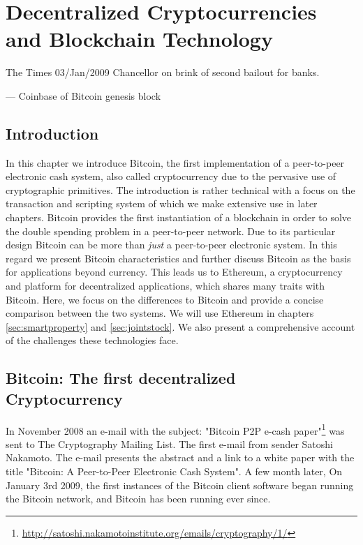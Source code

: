 \chapter{Decentralized Cryptocurrencies and Blockchain Technology}
\label{sec:crypto}

\epigraph{The Times 03/Jan/2009 Chancellor on brink of second bailout for banks.}{--- \textup{Coinbase of Bitcoin genesis block}}

\section{Introduction}
In this chapter we introduce Bitcoin, the first implementation of a peer-to-peer electronic cash system, also called cryptocurrency due to the pervasive use of cryptographic primitives. The introduction is rather technical with a focus on the transaction and scripting system of which we make extensive use in later chapters. Bitcoin provides the first instantiation of a blockchain in order to solve the double spending problem in a peer-to-peer network. Due to its particular design Bitcoin can be more than \emph{just} a peer-to-peer electronic system. In this regard we present Bitcoin characteristics and further discuss Bitcoin as the basis for applications beyond currency. This leads us to Ethereum, a cryptocurrency and platform for decentralized applications, which shares many traits with Bitcoin. Here, we focus on the differences to Bitcoin and provide a concise comparison between the two systems. We will use Ethereum in chapters \ref{sec:smartproperty} and \ref{sec:jointstock}. We also present a comprehensive account of the challenges these technologies face.

\section{Bitcoin: The first decentralized Cryptocurrency}

 In November 2008 an e-mail with the subject: "Bitcoin P2P e-cash paper"\footnote{\url{http://satoshi.nakamotoinstitute.org/emails/cryptography/1/}} was sent to The Cryptography Mailing List. The first e-mail from sender Satoshi Nakamoto. The e-mail presents the abstract and a link to a white paper with the title "Bitcoin: A Peer-to-Peer Electronic Cash System". A few month later, On January 3rd 2009, the first instances of the Bitcoin client software began running the Bitcoin network, and Bitcoin has been running ever since. 

